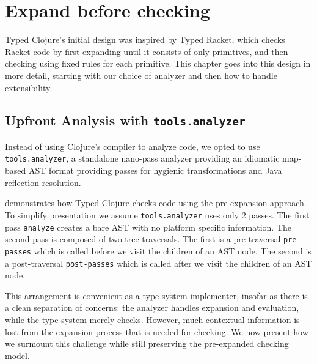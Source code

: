 \chapter{Expand before checking}

Typed Clojure's initial design was inspired by Typed Racket,
which checks Racket code by first expanding until it consists
of only primitives, and then checking using fixed rules for each
primitive.
This chapter goes into this design in more detail, starting
with our choice of analyzer and then how to handle extensibility.

\section{Upfront Analysis with \texttt{tools.analyzer}}

Instead of using Clojure's compiler to analyze code,
we opted to use \texttt{tools.analyzer}, a standalone nano-pass
analyzer providing an idiomatic map-based AST format providing
passes for hygienic transformations and Java reflection resolution.


 demonstrates 
how Typed Clojure checks code using the pre-expansion approach.
To simplify presentation we assume \texttt{tools.analyzer}
uses only 2 passes. The first pass \texttt{analyze} creates
a bare AST with no platform specific information.
The second pass is composed of two tree traversals.
The first is a pre-traversal \texttt{pre-passes} which
is called before we visit the children of an AST node.
The second is a post-traversal \texttt{post-passes} which
is called after we visit the children of an AST node.

This arrangement is convenient as a type system implementer,
insofar as there is a clean separation of concerns: the analyzer
handles expansion and evaluation, while the type system
merely checks.
However, much contextual information is lost from the expansion
process that is needed for checking.
We now present how we surmount this challenge while still
preserving the pre-expanded checking model.

